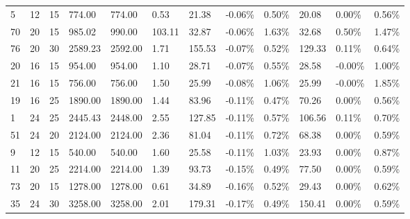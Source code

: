 \documentclass[../main]{subfiles}
\begin{document}
\begin{longtable}{l|ll|lll|lll|lll}
   5  & 12                         & 15                         & 774.00                    & 774.00   & 0.53                & 21.38  & -0.06\% & 0.50\% & 20.08  & 0.00\%  & 0.56\% \\
   70 & 20                         & 15                         & 985.02                    & 990.00   & 103.11              & 32.87  & -0.06\% & 1.63\% & 32.68  & 0.50\%  & 1.47\% \\
   76 & 20                         & 30                         & 2589.23                   & 2592.00  & 1.71                & 155.53 & -0.07\% & 0.52\% & 129.33 & 0.11\%  & 0.64\% \\
   20 & 16                         & 15                         & 954.00                    & 954.00   & 1.10                & 28.71  & -0.07\% & 0.55\% & 28.58  & -0.00\% & 1.00\% \\
   21 & 16                         & 15                         & 756.00                    & 756.00   & 1.50                & 25.99  & -0.08\% & 1.06\% & 25.99  & -0.00\% & 1.85\% \\
   19 & 16                         & 25                         & 1890.00                   & 1890.00  & 1.44                & 83.96  & -0.11\% & 0.47\% & 70.26  & 0.00\%  & 0.56\% \\
   1  & 24                         & 25                         & 2445.43                   & 2448.00  & 2.55                & 127.85 & -0.11\% & 0.57\% & 106.56 & 0.11\%  & 0.70\% \\
   51 & 24                         & 20                         & 2124.00                   & 2124.00  & 2.36                & 81.04  & -0.11\% & 0.72\% & 68.38  & 0.00\%  & 0.59\% \\
   9  & 12                         & 15                         & 540.00                    & 540.00   & 1.60                & 25.58  & -0.11\% & 1.03\% & 23.93  & 0.00\%  & 0.87\% \\
   11 & 20                         & 25                         & 2214.00                   & 2214.00  & 1.39                & 93.73  & -0.15\% & 0.49\% & 77.50  & 0.00\%  & 0.59\% \\
   73 & 20                         & 15                         & 1278.00                   & 1278.00  & 0.61                & 34.89  & -0.16\% & 0.52\% & 29.43  & 0.00\%  & 0.62\% \\
   35 & 24                         & 30                         & 3258.00                   & 3258.00  & 2.01                & 179.31 & -0.17\% & 0.49\% & 150.41 & 0.00\%  & 0.59\% \\

\end{longtable}
\end{document}
